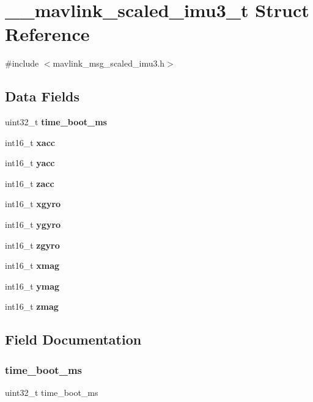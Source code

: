 \section{\+\_\+\+\_\+mavlink\+\_\+scaled\+\_\+imu3\+\_\+t Struct Reference}
\label{struct____mavlink__scaled__imu3__t}


{\ttfamily \#include $<$mavlink\+\_\+msg\+\_\+scaled\+\_\+imu3.\+h$>$}

\subsection*{Data Fields}
\begin{DoxyCompactItemize}
\item 
uint32\+\_\+t \textbf{ time\+\_\+boot\+\_\+ms}
\item 
int16\+\_\+t \textbf{ xacc}
\item 
int16\+\_\+t \textbf{ yacc}
\item 
int16\+\_\+t \textbf{ zacc}
\item 
int16\+\_\+t \textbf{ xgyro}
\item 
int16\+\_\+t \textbf{ ygyro}
\item 
int16\+\_\+t \textbf{ zgyro}
\item 
int16\+\_\+t \textbf{ xmag}
\item 
int16\+\_\+t \textbf{ ymag}
\item 
int16\+\_\+t \textbf{ zmag}
\end{DoxyCompactItemize}


\subsection{Field Documentation}
\mbox{\label{struct____mavlink__scaled__imu3__t_ad4e96ee46e36270d1ab66060e46f8c79}} 
\subsubsection{time\+\_\+boot\+\_\+ms}
{\footnotesize\ttfamily uint32\+\_\+t time\+\_\+boot\+\_\+ms}

\mbox{\label{struct____mavlink__scaled__imu3__t_a962ef46758affd4dcec9a67cb11ed051}} 
